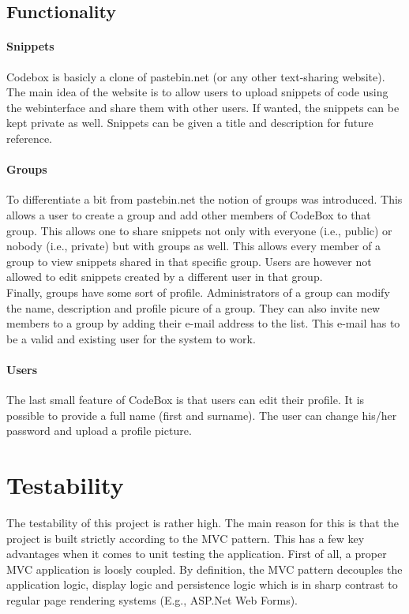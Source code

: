 \documentclass[10pt,a4paper,BCOR12mm, headexclude, footexclude,
  twoside, openright]{scrartcl}
\numberwithin{equation}{section} %
\numberwithin{figure}{section} %
\numberwithin{table}{section} %
\begin{document}
\subsection{Functionality}
\paragraph{Snippets}
Codebox is basicly a clone of pastebin.net (or any other text-sharing
website). The main idea of the website is to allow users to upload snippets of
code using the webinterface and share them with other users. If wanted, the
snippets can be kept private as well. Snippets can be given a title and
description for future reference.

\paragraph{Groups}
To differentiate a bit from pastebin.net the notion of groups was
introduced. This allows a user to create a group and add other members of
CodeBox to that group. This allows one to share snippets not only with everyone
(i.e., public) or nobody (i.e., private) but with groups as well. This allows
every member of a group to view snippets shared in that specific group. Users
are however not allowed to edit snippets created by a different user in that
group.\\ Finally, groups have some sort of profile. Administrators of a group
can modify the name, description and profile picure of a group. They can also
invite new members to a group by adding their e-mail address to the list. This
e-mail has to be a valid and existing user for the system to work.

\paragraph{Users}
The last small feature of CodeBox is that users can edit their profile. It is
possible to provide a full name (first and surname). The user can change his/her
password and upload a profile picture.

\section{Testability}
The testability of this project is rather high. The main reason for this is that
the project is built strictly according to the MVC pattern. This has a few key
advantages when it comes to unit testing the application. First of all, a proper
MVC application is loosly coupled. By definition, the MVC pattern decouples the
application logic, display logic and persistence logic which is in sharp
contrast to regular page rendering systems (E.g., ASP.Net Web Forms).
\end{document}
